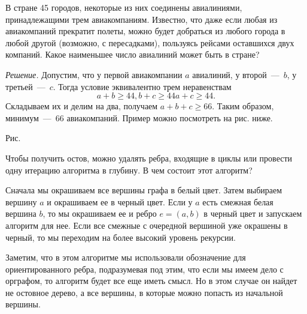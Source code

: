 \begin{example}
	В стране 45 городов, некоторые из них соединены авиалиниями, принадлежащими трем авиакомпаниям. Известно, что даже если любая из авиакомпаний прекратит полеты, можно будет добраться из любого города в любой другой (возможно, с пересадками), пользуясь рейсами оставшихся двух компаний. Какое наименьшее число авиалиний может быть в стране?

	\emph{Решение.} Допустим, что у первой авиакомпании $a$ авиалиний, у второй~---~$b$, у третьей~---~$c$. Тогда условие эквивалентно трем неравенствам
	$$a + b \geqslant 44, b + c \geqslant 44 a + c \geqslant 44.$$
	Складываем их и делим на два, получаем $a + b + c \geqslant 66$. Таким образом, минимум~---~66 авиакомпаний. Пример можно посмотреть на рис. ниже.
	
\begin{center}

	\small Рис. \images
\end{center}
\end{example}	

	Чтобы получить остов, можно удалять ребра, входящие в циклы или провести одну итерацию алгоритма в глубину. В чем состоит этот алгоритм?
	
	Сначала мы окрашиваем все вершины графа в белый цвет. Затем выбираем вершину $a$ и окрашиваем ее в черный цвет. Если у $a$ есть смежная белая вершина $b$, то мы окрашиваем ее и ребро $e = (a, b)$ в черный цвет и запускаем алгоритм для нее. Если все смежные с очередной вершиной уже окрашены в черный, то мы переходим на более высокий уровень рекурсии.
	
	Заметим, что в этом алгоритме мы использовали обозначение для ориентированного ребра, подразумевая под этим, что если мы имеем дело с орграфом, то алгоритм будет все еще иметь смысл. Но в этом случае он найдет не остовное дерево, а все вершины, в которые можно попасть из начальной вершины.

